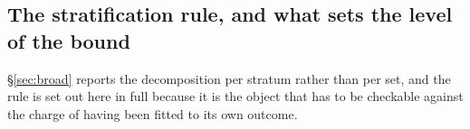 \subsection{The stratification rule, and what sets the level of the bound}
\label{sec:si-strat}
\S\ref{sec:broad} reports the decomposition per
stratum rather than per set, and the rule is set out here in full because it is the object that has
to be checkable against the charge of having been fitted to its own outcome.

